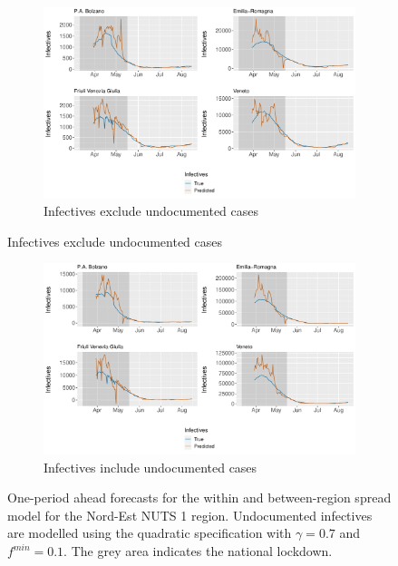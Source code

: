 \documentclass[12pt]{article}
\begin{document}
\begin{appendices}
		\begin{figure}[H]
    	    \centering
    	    \begin{subfigure}{\textwidth}
    	      \centering
    	      \includegraphics[width=0.91\linewidth]{output/model_between_lag14_forecast_start20_Nord-Est_rolling.pdf}
    	      \caption{Infectives exclude undocumented cases}
    	      \label{fig:forecast_between_nordest_regular}
    	    \end{subfigure}
        \end{figure}
        \begin{figure}[H]\ContinuedFloat
    	    \begin{subfigure}{\textwidth}
    	      \centering
    	      \includegraphics[width=0.91\linewidth]{output/model_between_lag14_forecast_start20_Nord-Est_UndocQuadratic_rolling.pdf}
    	      \caption{Infectives include undocumented cases}
    	      \label{fig:forecast_between_nordest_undoc}
    	    \end{subfigure}
    	    \caption{One-period ahead forecasts for the within and between-region spread model for the Nord-Est NUTS 1 region. Undocumented infectives are modelled using the quadratic specification with $\gamma = 0.7$ and $f^{min}=0.1$. The grey area indicates the national lockdown.}
    	    \label{fig:forecast_between_nordest}
        \end{figure}
        

\end{appendices}
\end{document}
